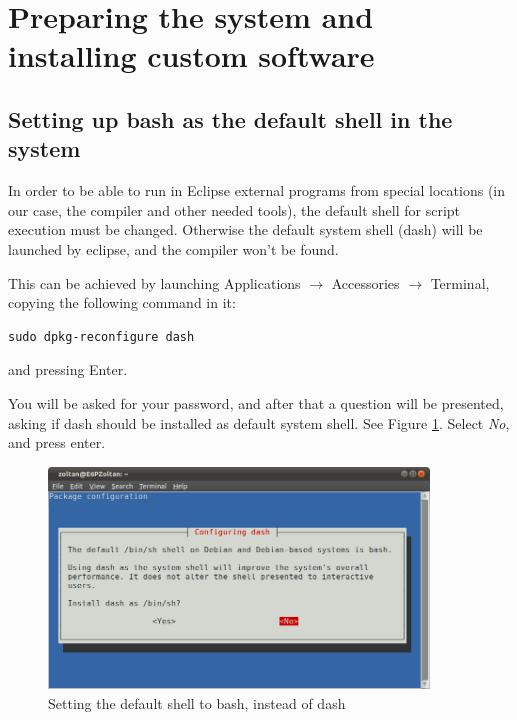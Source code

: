 \documentclass[a4paper, 10pt]{article}
\begin{document}
\section{Preparing the system and installing custom software}


\subsection{Setting up bash as the default shell in the system}

In order to be able to run in Eclipse external programs from special locations
(in our case, the compiler and other needed tools),
the default shell for script execution must be changed.
Otherwise the default system shell (dash) will be launched by eclipse,
and the compiler won't be found.

This can be achieved by launching Applications $\rightarrow$ Accessories $\rightarrow$ Terminal,
copying the following command in it:

\begin{verbatim}
sudo dpkg-reconfigure dash
\end{verbatim}

and pressing Enter.

You will be asked for your password,
and after that a question will be presented, asking
if dash should be installed as default system shell.
See Figure \ref{fig:set-dash-default}.
Select \emph{No}, and press enter.

    \begin{figure}[H]
    \centering
        \includegraphics[width=0.9\textwidth]{./png-install-guide/set-dash-default.png}
        \caption{Setting the default shell to bash, instead of dash}
        \label{fig:set-dash-default}
    \end{figure}
\end{document}
